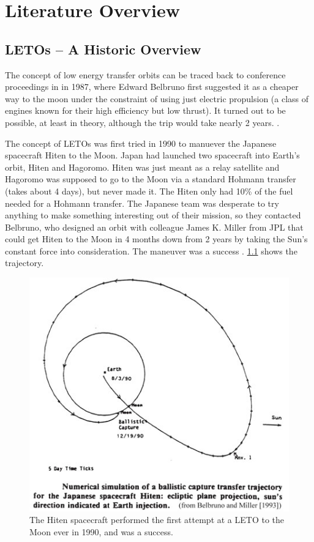 
\chapter{Literature Overview}
\section{LETOs – A Historic Overview}
The concept of low energy transfer orbits can be traced back to conference proceedings in in 1987, where Edward Belbruno first suggested it as a cheaper way to the moon under the constraint of using just electric propulsion (a class of engines known for their high efficiency but low thrust). It turned out to be possible, at least in theory, although the trip would take nearly 2 years. \cite{Belbruno1987} \cite{Benson}.

The concept of LETOs was first tried in 1990 to manuever the Japanese spacecraft Hiten to the Moon. Japan had launched two spacecraft into Earth's orbit, Hiten and Hagoromo. Hiten was just meant as a relay satellite and Hagoromo was supposed to go to the Moon via a standard Hohmann transfer (takes about 4 days), but never made it. The Hiten only had 10\% of the fuel needed for a Hohmann transfer. The Japanese team was desperate to try anything to make something interesting out of their mission, so they contacted Belbruno, who designed an orbit with colleague James K. Miller from JPL that could get Hiten to the Moon in 4 months down from 2 years by taking the Sun's constant force into consideration. The maneuver was a success \cite{Belbuno1990} \cite{Benson}. \cref{fig:hiten} shows the trajectory.

\begin{figure}[ht]
    \centering
    \includegraphics[width=0.50\linewidth]{fig/hiten.png}
    \caption{The Hiten spacecraft performed the first attempt at a LETO to the Moon ever in 1990, and was a success.}
    \label{fig:hiten}
\end{figure}

